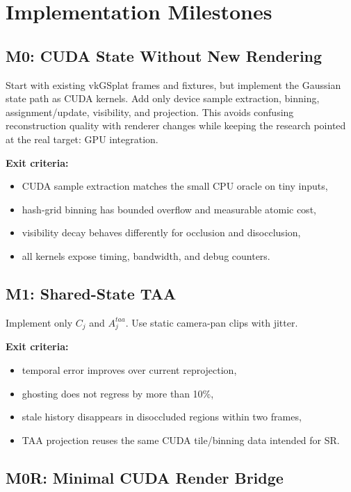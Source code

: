 \documentclass[11pt]{article}
\begin{document}
\section{Implementation Milestones}

\subsection{M0: CUDA State Without New Rendering}

Start with existing vkGSplat frames and fixtures, but implement the Gaussian
state path as CUDA kernels. Add only device sample extraction, binning,
assignment/update, visibility, and projection. This avoids confusing
reconstruction quality with renderer changes while keeping the research pointed
at the real target: GPU integration.

\textbf{Exit criteria:}

\begin{itemize}
  \item CUDA sample extraction matches the small CPU oracle on tiny inputs,
  \item hash-grid binning has bounded overflow and measurable atomic cost,
  \item visibility decay behaves differently for occlusion and disocclusion,
  \item all kernels expose timing, bandwidth, and debug counters.
\end{itemize}

\subsection{M1: Shared-State TAA}

Implement only $C_j$ and $A_j^{taa}$. Use static camera-pan clips with jitter.

\textbf{Exit criteria:}

\begin{itemize}
  \item temporal error improves over current reprojection,
  \item ghosting does not regress by more than 10\%,
  \item stale history disappears in disoccluded regions within two frames,
  \item TAA projection reuses the same CUDA tile/binning data intended for SR.
\end{itemize}

\subsection{M0R: Minimal CUDA Render Bridge}
\end{document}
